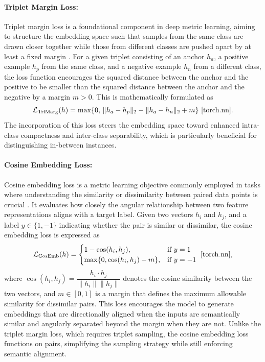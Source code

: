 \paragraph{Triplet Margin Loss:} Triplet margin loss is a foundational component in deep metric learning, aiming to structure the embedding space such that samples from the same class are drawn closer together while those from different classes are pushed apart by at least a fixed margin \cite{Yang19}. For a given triplet consisting of an anchor $h_a$, a positive example $h_p$ from the same class, and a negative example $h_n$ from a different class, the loss function encourages the squared distance between the anchor and the positive to be smaller than the squared distance between the anchor and the negative by a margin $m > 0$. This is mathematically formulated as
$$
\mathcal{L}_{\text{TriMarg}}(h) = \max\{0, \, \|h_a - h_p\|_2 - \|h_a - h_n\|_2 + m \} \ \cite{torch.nn}.
$$
The incorporation of this loss steers the embedding space toward enhanced intra-class compactness and inter-class separability, which is particularly beneficial for distinguishing in-between instances.

\paragraph{Cosine Embedding Loss:} Cosine embedding loss is a metric learning objective commonly employed in tasks where understanding the similarity or dissimilarity between paired data points is crucial \cite{Singh18}. It evaluates how closely the angular relationship between two feature representations aligns with a target label. Given two vectors $h_i$ and $h_j$, and a label $y \in \{1, -1\}$ indicating whether the pair is similar or dissimilar, the cosine embedding loss is expressed as
$$
\mathcal{L}_{\text{CosEmb}}(h) = 
\begin{cases}
1 - \cos(h_i, h_j), & \text{if } y = 1 \\
\max\{0, \cos(h_i, h_j) - m\}, & \text{if } y = -1
\end{cases}
\ \cite{torch.nn},
$$
where $\cos(h_i, h_j) = \dfrac{h_i \cdot h_j}{\|h_i\| \|h_j\|}$ denotes the cosine similarity between the two vectors, and $m \in [0,1]$ is a margin that defines the maximum allowable similarity for dissimilar pairs. This loss encourages the model to generate embeddings that are directionally aligned when the inputs are semantically similar and angularly separated beyond the margin when they are not. Unlike the triplet margin loss, which requires triplet sampling, the cosine embedding loss functions on pairs, simplifying the sampling strategy while still enforcing semantic alignment.

